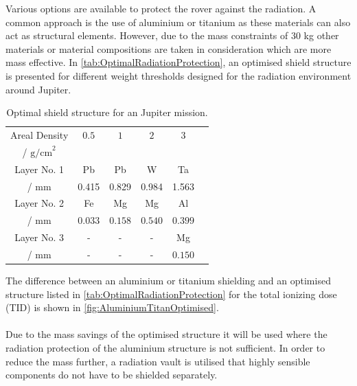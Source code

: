 \label{subsec:RadiationProtection}

Various options are available to protect the rover against the radiation. A common approach is the use of aluminium or titanium as these materials can also act as structural elements. However, due to the mass constraints of 30 kg other materials or material compositions are taken in consideration which are more mass effective. In \autoref{tab:OptimalRadiationProtection}, an optimised shield structure is presented for different weight thresholds designed for the radiation environment around Jupiter.

\begin{table}
\centering
\caption{Optimal shield structure for an Jupiter mission. \cite{8823057}}
\begin{adjustbox}{max width=\textwidth}
\begin{tabular}[l]{cccccc}

	\toprule
	
	Areal Density	&	\(0.5\)	&	\(1\) &  \(2\) & \(3\)	\\
	/ \(\text{g/cm}^2\)	&	&	&  & \\
	
	\midrule
	
	
	Layer No. 1	&	Pb &  Pb & W	& Ta	\\
	/ mm	&	0.415 &  0.829 & 0.984	& 1.563	\\
	
	
	Layer No. 2	&	Fe	&  Mg &	Mg & Al \\
	/ mm	&	\(0.033\)	&  \(0.158\) &	\(0.540\) & \(0.399\) \\
	
	
	Layer No. 3 &	-	&  -	& - & Mg \\
	/ mm &	-	&  -	& - & \(0.150\) \\
	

	\bottomrule

\end{tabular}
\end{adjustbox}
\label{tab:OptimalRadiationProtection}
\end{table}

The difference between an aluminium or titanium shielding and an optimised structure listed in \autoref{tab:OptimalRadiationProtection} for the total ionizing dose (TID) is shown in \autoref{fig:AluminiumTitanOptimised}. \\ \\
Due to the mass savings of the optimised structure it will be used where the radiation protection of the aluminium structure is not sufficient. In order to reduce the mass further, a radiation vault is utilised that highly sensible components do not have to be shielded separately.

